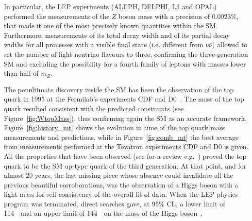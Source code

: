 In particular, the LEP experiments (ALEPH, DELPHI, L3 and OPAL) performed the measurements 
of the $Z$ boson mass with a precision of 0.0023\%, that made it one of the most 
precisely known quantities within the SM. %
Furthermore, measurements of its total 
decay width and of its partial decay widths for all processes with a 
visible final state (i.e. different from $\nu\bar\nu$) allowed to set 
the number of light neutrino flavours to three, confirming the three-generation 
SM and excluding the possibility for a fourth family of leptons with masses
 lower than half of $m_Z$.

The penultimate discovery inside the SM has been the observation of the 
top quark in 1995 at the Fermilab's experiments CDF and 
D0~\cite{PhysRevLett.74.2626,PhysRevLett.74.2422}. 
The mass of the top quark resulted consistent with the predicted 
constraints (see Figure~\ref{fig:WtopMass}), 
thus confirming again the SM as an accurate framework. 
Figure~\ref{fig:history_mt} shows the evolution in
time of the top quark mass measurements and predictions,
while in Figure~\ref{fig:comb_mt} the best average
from measurements performed at the Tevatron experiments
CDF and D0 is given. All the properties that have been
observed (see for a review e.g.~\cite{Wicke:2010cg})
proved the top quark to be the SM up-type quark of the third generation.
At that point, and for almost 20 years, the last missing piece whose
absence could invalidate all the previous beautiful corroborations, was
the observation of a Higgs boson with a light mass for  self-consistency 
of the overall fit of data. When the LEP physics program was terminated,
direct searches gave, at 95\% CL, a lower limit of 114~\gev\ and an upper 
limit of 144~\gev\ on the mass of the Higgs boson~\cite{Barate:2003sz}. %

